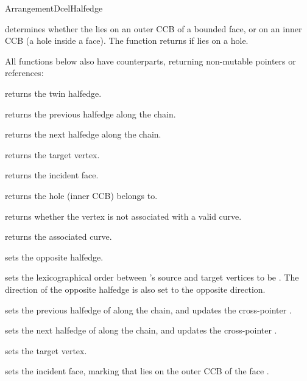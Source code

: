 \begin{ccRefConcept}{ArrangementDcelHalfedge}
{
    {determines whether the \ccVar{} lies on an outer CCB of a bounded face,
     or on an inner CCB (a hole inside a face). The function returns 
     if \ccVar{} lies on a hole.}

All functions below also have  counterparts, returning non-mutable
pointers or references:

    {returns the twin halfedge.}

    {returns the previous halfedge along the chain.}

    {returns the next halfedge along the chain.}

    {returns the target vertex.}

    {returns the incident face.
     }

    {returns the hole (inner CCB) \ccVar{} belongs to.
     }

    {returns whether the vertex is not associated with a valid curve.}
 
    {returns the associated curve.
     }

\ccModifiers

    {sets the opposite halfedge.}

    {sets the lexicographical order between \ccVar{}'s source and target
     vertices to be .
     The direction of the opposite halfedge is also set to the
     opposite direction.}

    {sets the previous halfedge of \ccVar{} along the chain,
     and updates the cross-pointer .}

    {sets the next halfedge of \ccVar{} along the chain,
     and updates the cross-pointer .}

    {sets the target vertex.}

    {sets the incident face, marking that \ccVar{} lies on the outer CCB
     of the face .}

}
\end{ccRefConcept}
